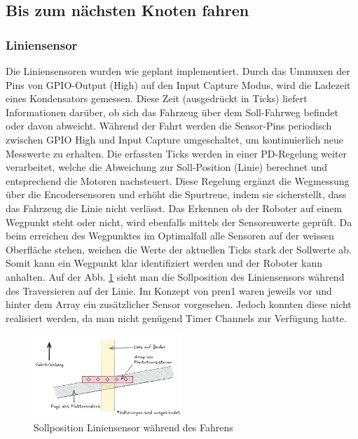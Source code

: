 \subsection{Bis zum nächsten Knoten fahren}

\subsubsection{Liniensensor}

Die Liniensensoren wurden wie geplant implementiert. Durch das Ummuxen der Pins von GPIO-Output (High) auf den Input Capture Modus, wird die Ladezeit eines Kondensators gemessen. Diese Zeit (ausgedrückt in Ticks) liefert Informationen darüber, ob sich das Fahrzeug über dem Soll-Fahrweg befindet oder davon abweicht. Während der Fahrt werden die Sensor-Pins periodisch zwischen GPIO High und Input Capture umgeschaltet, um kontinuierlich neue Messwerte zu erhalten. Die erfassten Ticks werden in einer PD-Regelung weiter verarbeitet, welche die Abweichung zur Soll-Position (Linie) berechnet und entsprechend die Motoren nachsteuert. Diese Regelung ergänzt die Wegmessung über die Encodersensoren und erhöht die Spurtreue, indem sie sicherstellt, dass das Fahrzeug die Linie nicht verlässt. Das Erkennen ob der Roboter auf einem Wegpunkt steht oder nicht, wird ebenfalls mittels der Sensorenwerte geprüft. Da beim erreichen des Wegpunktes im Optimalfall alle Sensoren auf der weissen Oberfläche stehen, weichen die Werte der aktuellen Ticks stark der Sollwerte ab. Somit kann ein Wegpunkt klar identifiziert werden und der Roboter kann anhalten. Auf der Abb. \ref{fig:liniensensor soll} sieht man die Sollposition des Liniensensors während des Traversieren auf der Linie. Im Konzept von \acrshort{pren1} waren jeweils vor und hinter dem Array ein zusätzlicher Sensor vorgesehen. Jedoch konnten diese nicht realisiert werden, da man nicht genügend Timer Channels zur Verfügung hatte.


 \begin{figure}[H]
\centering
\includegraphics[width=0.5\textwidth ]{assets/ET/Liniensensor/linesensor.png}
\caption{Sollposition Liniensensor während des Fahrens}
\label{fig:liniensensor soll}
\end{figure}

